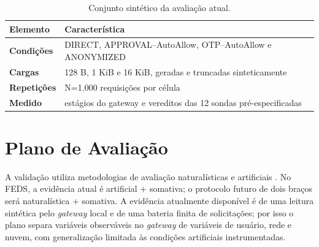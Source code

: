 \documentclass[12pt,openright,twoside,a4paper,english,brazil]{abntex2}
\begin{document}
\begin{table}[htbp]
\centering
\caption{Conjunto sintético da avaliação atual.}
\label{tab:dados-avaliacao}
\begin{tabularx}{\textwidth}{>{\bfseries}p{}X}
\toprule Elemento & Característica \\ \midrule
Condições & DIRECT, APPROVAL--AutoAllow, OTP--AutoAllow e ANONYMIZED \\
Cargas & 128 B, 1 KiB e 16 KiB, geradas e truncadas sinteticamente \\
Repetições & N=1.000 requisições por célula \\
Medido & estágios do gateway e vereditos das 12 sondas pré-especificadas \\
\bottomrule
\end{tabularx}
\end{table}

\section{Plano de Avaliação}
A validação utiliza metodologias de avaliação naturalísticas e artificiais \cite{venable2016}. No FEDS, a evidência atual é artificial + somativa; o protocolo futuro de dois braços será naturalística + somativa. A evidência atualmente disponível é de uma leitura sintética pelo \textit{gateway} local e de uma bateria finita de solicitações; por isso o plano separa variáveis observáveis no \textit{gateway} de variáveis de usuário, rede e nuvem, com generalização limitada às condições artificiais instrumentadas.
\end{document}
